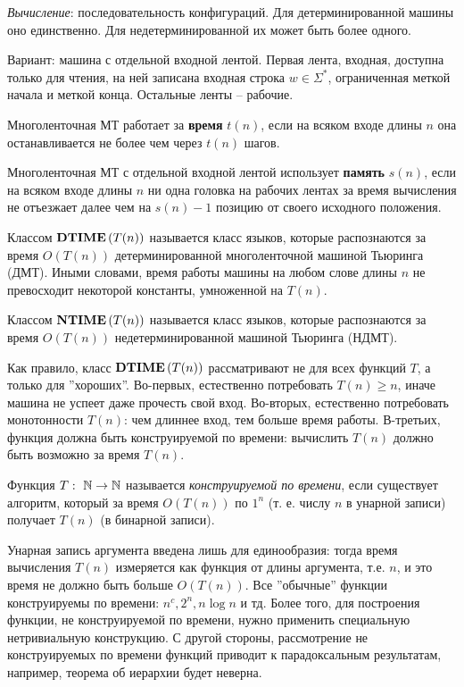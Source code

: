 \textit{Вычисление}:
последовательность конфигураций. Для детерминированной машины оно единственно. Для
недетерминированной их может быть более одного.

Вариант: машина с отдельной входной лентой. Первая лента, входная, доступна только
для чтения, на ней записана входная строка $w\in\Sigma^*$, ограниченная меткой начала и
меткой конца. Остальные ленты -- рабочие.

Многоленточная МТ работает за \textbf{время} $t(n)$, если на всяком входе длины $n$ она останавливается не более чем через $t(n)$ шагов. 

Многоленточная МТ с отдельной входной лентой использует \textbf{память} $s(n)$, если на всяком входе длины $n$ ни одна головка на рабочих лентах за время вычисления не отъезжает далее чем на $s(n) - 1$ позицию от своего исходного положения.

\begin{definition} Классом $\textbf{DTIME}\left({T(n)}\right)$ называется класс языков, которые распознаются за время $O(T(n))$ детерминированной многоленточной машиной Тьюринга (ДМТ). Иными словами, время работы машины на любом слове длины $n$ не превосходит некоторой константы, умноженной на $T(n)$.
\end{definition}

\begin{definition} Классом $\textbf{NTIME}\left({T(n)}\right)$ называется класс языков, которые распознаются за время $O(T(n))$ недетерминированной машиной Тьюринга (НДМТ).
\end{definition}

Как правило, класс $\textbf{DTIME}\left({T(n)}\right)$
рассматривают не для всех функций $T$,
а только для ''хороших''. Во-первых, естественно потребовать $T(n) \geqslant n$, иначе машина не успеет даже прочесть свой вход. Во-вторых, естественно потребовать монотонности $T(n)$: чем длиннее вход, тем больше время работы. В-третьих, функция должна быть конструируемой по времени: вычислить $T(n)$
должно быть возможно за время $T(n)$.

\begin{definition}
Функция $T :\ \mathbb{N} \to \mathbb{N}$
называется \textit{конструируемой по времени}, если существует алгоритм, который за время $O(T(n))$
по $1^n$ (т. е. числу $n$ в унарной записи) получает $T(n)$ (в бинарной записи).
\end{definition}

Унарная запись аргумента введена лишь для единообразия: тогда время
вычисления $T(n)$ измеряется как функция от длины аргумента, т.е. $n$,  и это
время не должно быть больше $O(T(n))$. Все ''обычные'' функции конструируемы по времени: $n^c, 2^n, n\log n$ и тд.  Более того, для построения функции, не конструируемой по времени, нужно применить специальную нетривиальную конструкцию. С другой стороны, рассмотрение не конструируемых по времени функций приводит к парадоксальным результатам, например, теорема об
иерархии будет неверна.

